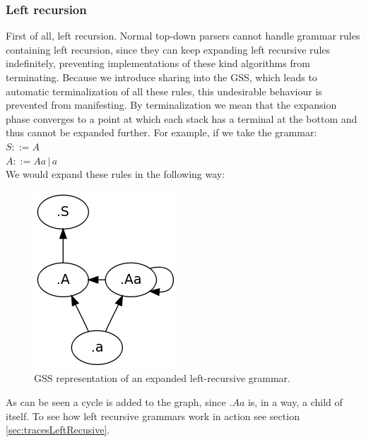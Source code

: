 \documentclass[a4paper,10pt]{article}
\begin{document}
\subsubsection{Left recursion}
First of all, left recursion. Normal top-down parsers cannot handle grammar rules containing left recursion, since they can keep expanding left recursive rules indefinitely, preventing implementations of these kind algorithms from terminating. Because we introduce sharing into the GSS, which leads to automatic terminalization of all these rules, this undesirable behaviour is prevented from manifesting. By terminalization we mean that the expansion phase converges to a point at which each stack has a terminal at the bottom and thus cannot be expanded further. For example, if we take the grammar:\\
$S ::= A$\\
$A ::= Aa\,|\,a$\\
We would expand these rules in the following way:
\begin{figure}[H]
\centering
\includegraphics[scale=0.5]{left-recursive.png}
\caption{GSS representation of an expanded left-recursive grammar.}
\end{figure}
As can be seen a cycle is added to the graph, since $.Aa$ is, in a way, a child of itself. To see how left recursive grammars work in action see section \ref{sec:tracesLeftRecusive}.
\end{document}
